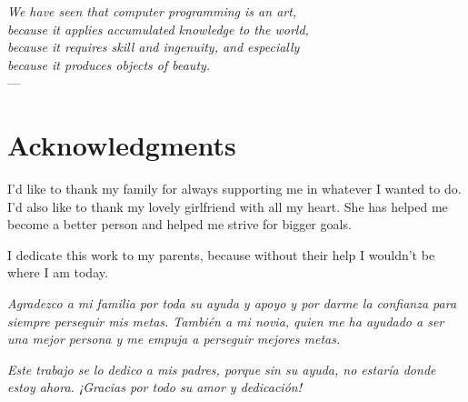 
\begin{flushright}{\slshape    
    We have seen that computer programming is an art, \\ 
    because it applies accumulated knowledge to the world, \\ 
    because it requires skill and ingenuity, and especially \\
    because it produces objects of beauty.} \\ \medskip
    ---  \citep{knuth:1974}
\end{flushright}



\bigskip

\begingroup
\let\clearpage\relax
\let\cleardoublepage\relax
\let\cleardoublepage\relax
\chapter*{Acknowledgments}
I'd like to thank my family for always supporting me in whatever I wanted to do. I'd also like to thank my lovely girlfriend with all my heart. She has helped me become a better person and helped me strive for bigger goals.


I dedicate this work to my parents, because without their help I wouldn't be where I am today.
\bigskip

\textit{Agradezco a mi familia por toda su ayuda y apoyo y por darme la confianza para siempre perseguir mis metas. También a mi novia, quien me ha ayudado a ser una mejor persona y me empuja a perseguir mejores metas.}

\textit{Este trabajo se lo dedico a mis padres, porque sin su ayuda, no estaría donde estoy ahora. ¡Gracias por todo su amor y dedicación!}

\endgroup



